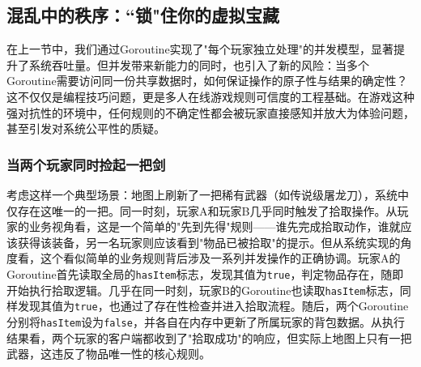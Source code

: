 
\subsection{混乱中的秩序：“锁"住你的虚拟宝藏}

在上一节中，我们通过Goroutine实现了"每个玩家独立处理"的并发模型，显著提升了系统吞吐量。但并发带来新能力的同时，也引入了新的风险：当多个Goroutine需要访问同一份共享数据时，如何保证操作的原子性与结果的确定性？这不仅仅是编程技巧问题，更是多人在线游戏规则可信度的工程基础。在游戏这种强对抗性的环境中，任何规则的不确定性都会被玩家直接感知并放大为体验问题，甚至引发对系统公平性的质疑。

\subsubsection{当两个玩家同时捡起一把剑}

考虑这样一个典型场景：地图上刷新了一把稀有武器（如传说级屠龙刀），系统中仅存在这唯一的一把。同一时刻，玩家A和玩家B几乎同时触发了拾取操作。从玩家的业务视角看，这是一个简单的"先到先得"规则——谁先完成拾取动作，谁就应该获得该装备，另一名玩家则应该看到"物品已被拾取"的提示。但从系统实现的角度看，这个看似简单的业务规则背后涉及一系列并发操作的正确协调。玩家A的Goroutine首先读取全局的\texttt{hasItem}标志，发现其值为\texttt{true}，判定物品存在，随即开始执行拾取逻辑。几乎在同一时刻，玩家B的Goroutine也读取\texttt{hasItem}标志，同样发现其值为\texttt{true}，也通过了存在性检查并进入拾取流程。随后，两个Goroutine分别将\texttt{hasItem}设为\texttt{false}，并各自在内存中更新了所属玩家的背包数据。从执行结果看，两个玩家的客户端都收到了"拾取成功"的响应，但实际上地图上只有一把武器，这违反了物品唯一性的核心规则。

